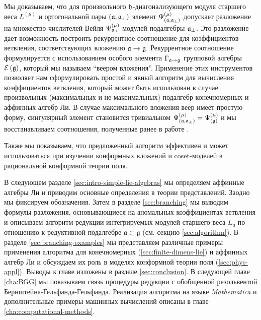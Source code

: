 Мы доказываем, что для произвольного $\mathfrak{h}$-диагонализующего модуля старшего веса $L^{\left( \mu \right)}$ и ортогональной пары $\left(  \mathfrak{a}, \mathfrak{a}_{\perp} \right)$ элемент
$\Psi ^{\left( \mu \right) }_{\left(  \mathfrak{a}, \mathfrak{a}_{\perp} \right)}$ допускает разложение на множество числителей Вейля $\Psi ^{\left( \mu \right) }_{ \mathfrak{a}_{\perp} }$ модулей подалгебры $\mathfrak{a}_{\perp}$.
Это разложение дает возможность построить рекуррентное соотношение для коэффициентов ветвления, соответствующих вложению $\mathfrak{a} \rightarrow \mathfrak{g} $. Рекуррентное соотношение формулируется с использованием особого элемента  $\Gamma_{\mathfrak{a} \rightarrow \mathfrak{g}}$ групповой алгебры
$\mathcal{E}\left( \mathfrak{g} \right)$, который мы называем ``веером вложения''. 
Применение этих инструментов позволяет нам сформулировать простой и явный алгоритм для вычисления коэффициентов ветвления, который может быть использован в случае произвольных (максимальных и не максимальных) подалгебр конечномерных и аффинных алгебр Ли. 
В случае максимального вложения веер имеет простую форму, сингулярный элемент становится тривиальном $\Psi ^{\left( \mu \right) }_{\left(  \mathfrak{a}, \mathfrak{a}_{\perp} \right)}=\Psi ^{\left( \mu \right) }_{\left(  \mathfrak{g}\right)}$ и мы восстанавливаем соотношения, полученные ранее в работе \cite{ilyin812pbc}.

Также мы показываем, что предложенный алгоритм эффективен и может использоваться при изучении конформных вложений и coset-моделей в рациональной конформной теории поля.

В следующем разделе \ref{sec:intro-simple-lie-algebras} мы определяем аффинные алгебры Ли и приводим основные определения в теории представлений.  Заодно мы фиксируем обозначения. Затем в разделе \ref{sec:branching} мы выводим формулы разложения, основывающиеся на аномальных коэффициентах ветвления и описываем алгоритм редукции интегрируемых модулей старшего веса $L_{\mathfrak{g}}$ по отношению к редуктивной подалгебре  $\mathfrak{a}\subset \mathfrak{g}$ (см. секцию \ref{sec:algorithm}). В разделе \ref{sec:branching-examples} мы представляем различные примеры применения алгоритма для конечномерных (\ref{sec:finite-dimens-lie}) и аффинных алгебр Ли и обсуждаем их роль в моделях конформной теории поля (\ref{sec:phys-appl}). Выводы к главе изложены в разделе \ref{sec:conclusion}. В следующей главе \ref{cha:BGG} мы показываем связь процедуры редукции с обобщенной резольвентой Бернштейна-Гельфанда-Гельфанда.  Реализация алгоритма на языке {\it Mathematica} и дополнительные примеры машинных вычислений описаны в главе  \ref{cha:computational-methods}. 

